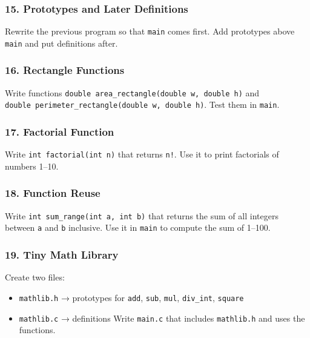 \documentclass[
  letterpaper,
  DIV=11,
  numbers=noendperiod]{scrreprt}
\providecommand{\tightlist}{%
  \setlength{\itemsep}{0pt}\setlength{\parskip}{0pt}}
\begin{document}
\subsubsection{15. Prototypes and Later
Definitions}\label{prototypes-and-later-definitions}

Rewrite the previous program so that \texttt{main} comes first. Add
prototypes above \texttt{main} and put definitions after.

\subsubsection{16. Rectangle Functions}\label{rectangle-functions}

Write functions \texttt{double\ area\_rectangle(double\ w,\ double\ h)}
and \texttt{double\ perimeter\_rectangle(double\ w,\ double\ h)}. Test
them in \texttt{main}.

\subsubsection{17. Factorial Function}\label{factorial-function}

Write \texttt{int\ factorial(int\ n)} that returns \texttt{n!}. Use it
to print factorials of numbers 1--10.

\subsubsection{18. Function Reuse}\label{function-reuse}

Write \texttt{int\ sum\_range(int\ a,\ int\ b)} that returns the sum of
all integers between \texttt{a} and \texttt{b} inclusive. Use it in
\texttt{main} to compute the sum of 1--100.

\subsubsection{19. Tiny Math Library}\label{tiny-math-library}

Create two files:

\begin{itemize}
\tightlist
\item
  \texttt{mathlib.h} → prototypes for \texttt{add}, \texttt{sub},
  \texttt{mul}, \texttt{div\_int}, \texttt{square}
\item
  \texttt{mathlib.c} → definitions Write \texttt{main.c} that includes
  \texttt{mathlib.h} and uses the functions.
\end{itemize}
\end{document}
